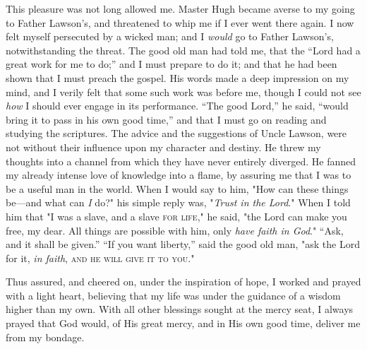 This pleasure was not long allowed me. Master Hugh became averse to my
going to Father Lawson's, and threatened to whip me if I ever went there
again. I now felt myself persecuted by a wicked man; and I \emph{would}
go to Father Lawson's, notwithstanding the threat. The good old man had
told me, that the ``Lord had a great work for me to do;'' and I must
prepare to do it; and that he had been shown that I must preach the
gospel. His words made a deep impression on my mind, and I verily felt
that some such {}work was before me, though I could not see \emph{how} I
should ever engage in its performance. ``The good Lord,'' he said,
``would bring it to pass in his own good time,'' and that I must go on
reading and studying the scriptures. The advice and the suggestions of
Uncle Lawson, were not without their influence upon my character and
destiny. He threw my thoughts into a channel from which they have never
entirely diverged. He fanned my already intense love of knowledge into a
flame, by assuring me that I was to be a useful man in the world. When I
would say to him, "How can these things be---and what can \emph{I} do?"
his simple reply was, "\emph{Trust in the Lord}." When I told him that
"I was a slave, and a slave \textsc{for life}," he said, "the Lord can
make you free, my dear. All things are possible with him, only
\emph{have faith in God}." ``Ask, and it shall be given.'' ``If you want
liberty,'' said the good old man, "ask the Lord for it, \emph{in faith},
\textsc{and he will give it to you}."

Thus assured, and cheered on, under the inspiration of hope, I worked
and prayed with a light heart, believing that my life was under the
guidance of a wisdom higher than my own. With all other blessings sought
at the mercy seat, I always prayed that God would, of His great mercy,
and in His own good time, deliver me from my bondage.

